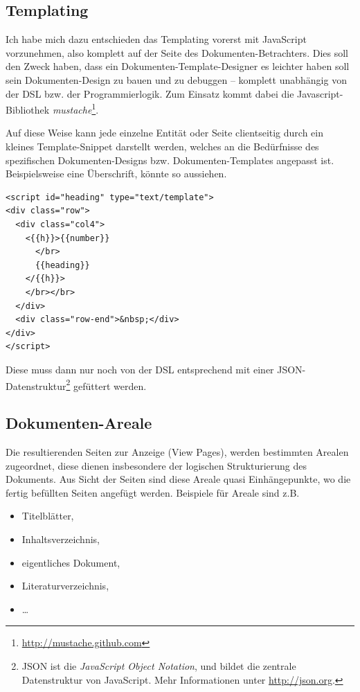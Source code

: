 \subsection{Templating}\label{sec-templating}

Ich habe mich dazu entschieden das Templating vorerst mit JavaScript
vorzunehmen, also komplett auf der Seite des Dokumenten-Betrachters.
Dies soll den Zweck haben, dass ein Dokumenten-Template-Designer es
leichter haben soll sein Dokumenten-Design zu bauen und zu debuggen --
komplett unabhängig von der DSL bzw. der Programmierlogik.
Zum Einsatz kommt dabei die Javascript-Bib\-lio\-thek
\emph{mustache}\footnote{\url{http://mustache.github.com}}.

Auf diese Weise kann jede einzelne Entität oder Seite clientseitig
durch ein kleines Template-Snippet darstellt werden, welches an die
Bedürfnisse des spezifischen Dokumenten-Designs bzw. Dokumenten-Templates
angepasst ist. Beispielsweise eine Überschrift, könnte so aussiehen.

\begin{verbatim}
<script id="heading" type="text/template">
<div class="row">
  <div class="col4">
    <{{h}}>{{number}}
      </br>
      {{heading}}
    </{{h}}>
    </br></br>
  </div>
  <div class="row-end">&nbsp;</div>
</div>
</script>
\end{verbatim}

Diese muss dann nur noch von der DSL entsprechend mit einer
JSON-Daten\-struktur\footnote{JSON ist die \emph{JavaScript Object Notation},
und bildet die zentrale Datenstruktur von JavaScript.
Mehr Informationen unter \url{http://json.org}.} gefüttert werden.

\subsection{Dokumenten-Areale}\label{sec-areal}

Die resultierenden Seiten zur Anzeige (View Pages), werden bestimmten
Arealen zugeordnet, diese dienen insbesondere der logischen Strukturierung
des Dokuments. Aus Sicht der Seiten sind diese Areale quasi
Einhängepunkte, wo die fertig befüllten Seiten angefügt werden.
Beispiele für Areale sind z.B.

\begin{itemize}
  \item Titelblätter,
  \item Inhaltsverzeichnis,
  \item eigentliches Dokument,
  \item Literaturverzeichnis,
  \item \ldots
\end{itemize}

